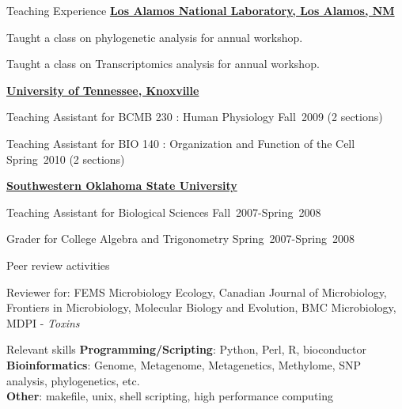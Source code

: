 \documentclass{resume} %
\begin{document}
\begin{rSection}{Teaching Experience}{}{}{}
\href{http://www.lanl.gov}{\bf Los Alamos National Laboratory, Los Alamos, NM }
\item Taught a class on phylogenetic analysis for annual workshop.
\item Taught a class on Transcriptomics analysis for annual workshop.

\href{http://www.utk.edu}{\bf University of Tennessee, Knoxville}
\item Teaching Assistant for BCMB 230 : Human Physiology Fall~2009 (2 sections)
\item Teaching Assistant for BIO 140 : Organization and Function of the Cell  Spring~2010 (2 sections)

\href{http://www.swosu.edu}{\textbf{Southwestern Oklahoma State University}}
 \item Teaching Assistant for Biological Sciences Fall~2007-Spring~2008
\item Grader for College Algebra and Trigonometry Spring~2007-Spring~2008

\end{rSection}



\begin{rSection}{Peer review activities}

Reviewer for: FEMS Microbiology Ecology, Canadian Journal of Microbiology, Frontiers in Microbiology, Molecular Biology and Evolution, BMC Microbiology, MDPI - \textit{Toxins}
\end{rSection}



\begin{rSection}{Relevant skills}
{\bf Programming/Scripting}: Python, Perl, R, bioconductor\\
{\bf Bioinformatics}: Genome, Metagenome, Metagenetics, Methylome, SNP analysis, phylogenetics, etc.\\
{\bf Other}: makefile, unix, shell scripting, high performance computing\\
\end{rSection}






\end{document}
